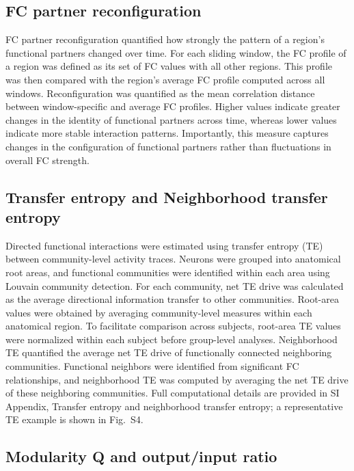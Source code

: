 \documentclass[9pt,twocolumn,twoside]{pnas-new}
\begin{document}
{\subsection*{FC partner reconfiguration}

FC partner reconfiguration quantified how strongly the pattern of a region's functional partners changed over time. For each sliding window, the FC profile of a region was defined as its set of FC values with all other regions. This profile was then compared with the region's average FC profile computed across all windows. Reconfiguration was quantified as the mean correlation distance between window-specific and average FC profiles. Higher values indicate greater changes in the identity of functional partners across time, whereas lower values indicate more stable interaction patterns. Importantly, this measure captures changes in the configuration of functional partners rather than fluctuations in overall FC strength.



\subsection*{Transfer entropy and Neighborhood transfer entropy}

Directed functional interactions were estimated using transfer entropy (TE) between community-level activity traces. Neurons were grouped into anatomical root areas, and functional communities were identified within each area using Louvain community detection. For each community, net TE drive was calculated as the average directional information transfer to other communities. Root-area values were obtained by averaging community-level measures within each anatomical region. To facilitate comparison across subjects, root-area TE values were normalized within each subject before group-level analyses. Neighborhood TE quantified the average net TE drive of functionally connected neighboring communities. Functional neighbors were identified from significant FC relationships, and neighborhood TE was computed by averaging the net TE drive of these neighboring communities. Full computational details are provided in SI Appendix, Transfer entropy and neighborhood transfer entropy; a representative TE example is shown in Fig.~S4.

\subsection*{Modularity Q and output/input ratio}

}
\end{document}

